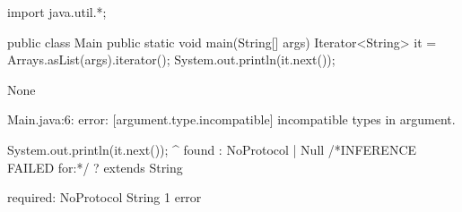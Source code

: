 \begin{code}
import java.util.*;

public class Main {
	public static void main(String[] args) {
    Iterator<String> it = Arrays.asList(args).iterator();
    System.out.println(it.next());
	}
}\end{code}

\lstset{language=,caption=Original Mungo output}
\begin{code}
None
\end{code}

\lstset{language=,caption=New Mungo output}
\begin{code}
Main.java:6: error: [argument.type.incompatible] incompatible types in argument.

    System.out.println(it.next());
                              ^
  found   : NoProtocol | Null /*INFERENCE FAILED for:*/ ? extends String

  required: NoProtocol String
1 error
\end{code}

